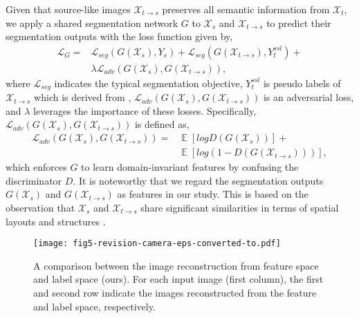 \documentclass[runningheads]{llncs}
\begin{document}
	Given that source-like images $ \mathcal{X}_{t{\rightarrow}s} $ preserves all semantic information from $ \mathcal{X}_t $, we apply a shared segmentation network $ G $ to $ \mathcal{X}_s $ and $ \mathcal{X}_{t{\rightarrow}s} $ to predict their segmentation outputs with the loss function given by,
	\begin{equation} \label{eq:1}
	\begin{aligned}
	\mathcal{L}_{G} = {} &
	\mathcal{L}_{seg}(G(\mathcal{X}_s), Y_s) + \mathcal{L}_{seg}(G(\mathcal{X}_{t{\rightarrow}s}), Y_t^{ssl}) + \\ &
	\lambda \mathcal{L}_{adv}(G(\mathcal{X}_s), G(\mathcal{X}_{t{\rightarrow}s})),
	\end{aligned}
	\end{equation}
	where $ \mathcal{L}_{seg} $ indicates the typical segmentation objective, $ Y_t^{ssl} $ is pseudo labels of $ \mathcal{X}_{t{\rightarrow}s} $ which is derived from \cite{li2019bidirectional}, $ \mathcal{L}_{adv}(G(\mathcal{X}_s), G(\mathcal{X}_{t{\rightarrow}s})) $ is an adversarial loss, and $ \lambda $ leverages the importance of these losses. Specifically, $ \mathcal{L}_{adv}(G(\mathcal{X}_s), G(\mathcal{X}_{t{\rightarrow}s})) $ is defined as,
	\begin{equation}
	\begin{aligned}
	\mathcal{L}_{adv}(G(\mathcal{X}_s), G(\mathcal{X}_{t{\rightarrow}s})) = {} & 
	\mathop{\mathbb{E}}[log{D(G(\mathcal{X}_s))}] + \\ &
	\mathop{\mathbb{E}}[log{(1 - D(G(\mathcal{X}_{t{\rightarrow}s})))}],
	\end{aligned}
	\end{equation}
	which enforces $ G $ to learn domain-invariant features by confusing the discriminator $ D $. It is noteworthy that we regard the segmentation outputs $ G(\mathcal{X}_s) $ and $ G(\mathcal{X}_{t{\rightarrow}s}) $ as features in our study. This is based on the observation that $ \mathcal{X}_s $ and $ \mathcal{X}_{t{\rightarrow}s} $ share significant similarities in terms of spatial layouts and structures \cite{tsai2018learning}. 
	


	\begin{figure}[t]
		\begin{center}
			\texttt{[image: fig5-revision-camera-eps-converted-to.pdf]}
		\end{center}
		\caption{A comparison between the image reconstruction from feature space and label space (ours). For each input image (first column), the first and second row indicate the images reconstructed from the feature and label space, respectively.}
		\label{fig:reconstruction}
\end{figure}
	
\end{document}
